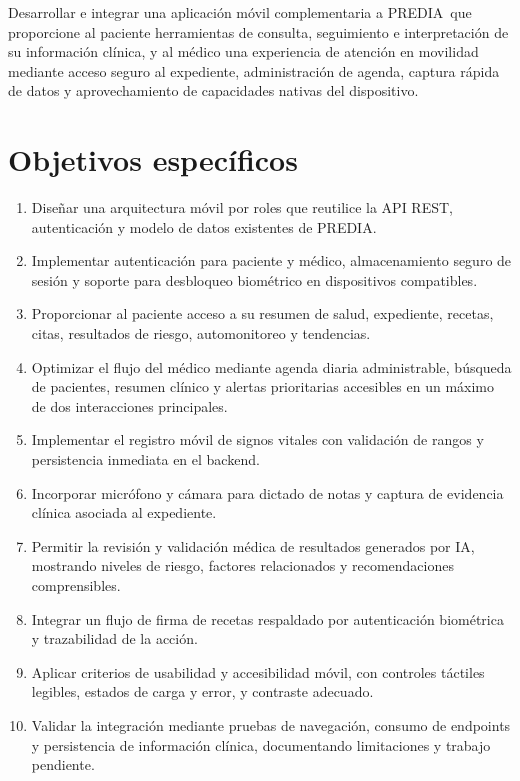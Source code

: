 \documentclass[12pt,letterpaper]{report}
\newcommand{\projectname}{PREDIA}
\begin{document}
Desarrollar e integrar una aplicación móvil complementaria a \projectname\ que proporcione al paciente herramientas de consulta, seguimiento e interpretación de su información clínica, y al médico una experiencia de atención en movilidad mediante acceso seguro al expediente, administración de agenda, captura rápida de datos y aprovechamiento de capacidades nativas del dispositivo.

\section{Objetivos específicos}

\begin{enumerate}[label=\textbf{OE\arabic*.},leftmargin=1.8cm]
  \item Diseñar una arquitectura móvil por roles que reutilice la API REST, autenticación y modelo de datos existentes de \projectname.
  \item Implementar autenticación para paciente y médico, almacenamiento seguro de sesión y soporte para desbloqueo biométrico en dispositivos compatibles.
  \item Proporcionar al paciente acceso a su resumen de salud, expediente, recetas, citas, resultados de riesgo, automonitoreo y tendencias.
  \item Optimizar el flujo del médico mediante agenda diaria administrable, búsqueda de pacientes, resumen clínico y alertas prioritarias accesibles en un máximo de dos interacciones principales.
  \item Implementar el registro móvil de signos vitales con validación de rangos y persistencia inmediata en el backend.
  \item Incorporar micrófono y cámara para dictado de notas y captura de evidencia clínica asociada al expediente.
  \item Permitir la revisión y validación médica de resultados generados por IA, mostrando niveles de riesgo, factores relacionados y recomendaciones comprensibles.
  \item Integrar un flujo de firma de recetas respaldado por autenticación biométrica y trazabilidad de la acción.
  \item Aplicar criterios de usabilidad y accesibilidad móvil, con controles táctiles legibles, estados de carga y error, y contraste adecuado.
  \item Validar la integración mediante pruebas de navegación, consumo de endpoints y persistencia de información clínica, documentando limitaciones y trabajo pendiente.
\end{enumerate}
\end{document}
